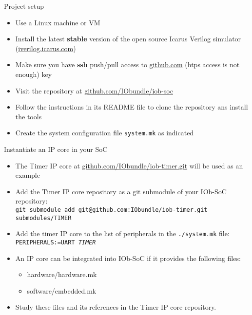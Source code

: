 \documentclass [xcolor=svgnames, t] {beamer}
\begin{document}
\begin{frame}{Project setup}
\begin{center}
  \begin{itemize}
    \item Use a Linux machine or VM
    \item Install the latest {\bf stable} version of the open source Icarus Verilog simulator (\url{iverilog.icarus.com})
    \item Make sure you have {\bf ssh} push/pull access to \url{github.com} (htps access is not enough)
      key
    \item Visit the repository at \url{github.com/IObundle/iob-soc}
    \item Follow the instructions in its README file to clone the repository ans install the tools
    \item Create the system configuration file {\tt system.mk} as indicated
  \end{itemize}
\end{center}
\end{frame}


\begin{frame}{Instantiate an IP core in your SoC}
  \begin{itemize}
  \item The Timer IP core at \url{github.com/IObundle/iob-timer.git} will be used as an example
  \item Add the Timer IP core repository as a git submodule of your IOb-SoC repository:\\
    {\tt \tiny git submodule add git@github.com:IObundle/iob-timer.git submodules/TIMER}
  \item Add the timer IP core to the list of peripherals in the {\tt ./system.mk} file:\\
    {\tt PERIPHERALS:=UART {\em TIMER}}
  \item An IP core can be integrated into IOb-SoC if it provides the following files: 
    \begin{itemize}
    \item hardware/hardware.mk
    \item software/embedded.mk
    \end{itemize}
  \item Study these files and its references in the Timer IP core repository.
  \end{itemize}
\end{frame}
\end{document}
